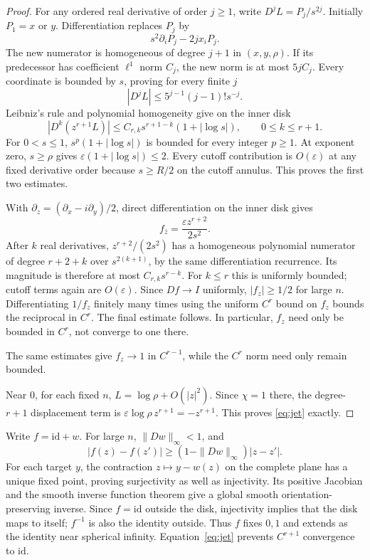 \documentclass[11pt]{article}
\newcommand{\id}{\mathrm{id}}
\begin{document}
\begin{proof}
For any ordered real derivative of order $j\geq1$, write $D^jL=P_j/s^{2j}$. Initially $P_1=x$ or $y$. Differentiation replaces $P_j$ by
\[
 s^2\partial_iP_j-2j x_iP_j.
\]
The new numerator is homogeneous of degree $j+1$ in $(x,y,\rho)$. If its predecessor has coefficient $\ell^1$ norm $C_j$, the new norm is at most $5jC_j$. Every coordinate is bounded by $s$, proving for every finite $j$
\[
 |D^jL|\leq5^{j-1}(j-1)!s^{-j}.
\]
Leibniz's rule and polynomial homogeneity give on the inner disk
\begin{equation}\label{eq:leibniz}
 |D^k(z^{r+1}L)|\leq C_{r,k}s^{r+1-k}(1+|\log s|),
 \qquad 0\leq k\leq r+1.
\end{equation}
For $0<s\leq1$, $s^p(1+|\log s|)$ is bounded for every integer $p\geq1$. At exponent zero, $s\geq\rho$ gives $\varepsilon(1+|\log s|)\leq2$. Every cutoff contribution is $O(\varepsilon)$ at any fixed derivative order because $s\geq R/2$ on the cutoff annulus. This proves the first two estimates.

With $\partial_z=(\partial_x-i\partial_y)/2$, direct differentiation on the inner disk gives
\[
 f_{\bar z}=\frac{\varepsilon z^{r+2}}{2s^2}.
\]
After $k$ real derivatives, $z^{r+2}/(2s^2)$ has a homogeneous polynomial numerator of degree $r+2+k$ over $s^{2(k+1)}$, by the same differentiation recurrence. Its magnitude is therefore at most $C_{r,k}s^{r-k}$. For $k\leq r$ this is uniformly bounded; cutoff terms again are $O(\varepsilon)$. Since $Df\to I$ uniformly, $|f_z|\geq1/2$ for large $n$. Differentiating $1/f_z$ finitely many times using the uniform $C^r$ bound on $f_z$ bounds the reciprocal in $C^r$. The final estimate follows. In particular, $f_z$ need only be bounded in $C^r$, not converge to one there.

The same estimates give $f_z\to1$ in $C^{r-1}$, while the $C^r$ norm need only remain bounded.

Near $0$, for each fixed $n$, $L=\log\rho+O(|z|^2)$. Since $\chi=1$ there, the degree-$r+1$ displacement term is $\varepsilon\log\rho\,z^{r+1}=-z^{r+1}$. This proves \eqref{eq:jet} exactly.
\end{proof}

Write $f=\id+w$. For large $n$, $\|Dw\|_\infty<1$, and
\[
 |f(z)-f(z')|\geq(1-\|Dw\|_\infty)|z-z'|.
\]
For each target $y$, the contraction $z\mapsto y-w(z)$ on the complete plane has a unique fixed point, proving surjectivity as well as injectivity. Its positive Jacobian and the smooth inverse function theorem give a global smooth orientation-preserving inverse. Since $f=\id$ outside the disk, injectivity implies that the disk maps to itself; $f^{-1}$ is also the identity outside. Thus $f$ fixes $0,1$ and extends as the identity near spherical infinity. Equation~\eqref{eq:jet} prevents $C^{r+1}$ convergence to $\id$.
\end{document}
